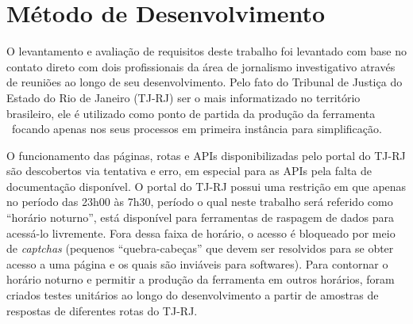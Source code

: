 \section{Método de Desenvolvimento}

O levantamento e avaliação de requisitos deste trabalho foi levantado com base
no contato direto com dois profissionais da área de jornalismo investigativo
através de reuniões ao longo de seu desenvolvimento. Pelo fato do Tribunal de
Justiça do Estado do Rio de Janeiro (TJ-RJ) ser o mais informatizado no
território brasileiro, ele é utilizado como ponto de partida da produção da
ferramenta \tjscraper~focando apenas nos seus processos em primeira instância
para simplificação.

O funcionamento das páginas, rotas e APIs disponibilizadas pelo portal do TJ-RJ
são descobertos via tentativa e erro, em especial para as APIs pela falta de
documentação disponível. O portal do TJ-RJ possui uma restrição em que apenas
no período das 23h00 às 7h30, período o qual neste trabalho será referido como
``horário noturno'', está disponível para ferramentas de raspagem de dados para
acessá-lo livremente. Fora dessa faixa de horário, o acesso é bloqueado por
meio de \textit{captchas} (pequenos ``quebra-cabeças'' que devem ser resolvidos
para se obter acesso a uma página e os quais são inviáveis para softwares).
Para contornar o horário noturno e permitir a produção da ferramenta em outros
horários, foram criados testes unitários ao longo do desenvolvimento a partir
de amostras de respostas de diferentes rotas do TJ-RJ.

